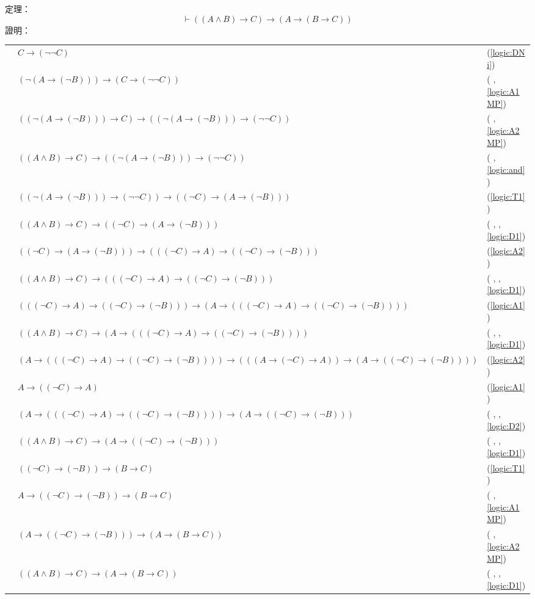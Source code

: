 \documentclass{article}
\newcommand{\sd}[1]{{\left(#1\right)}}
\newcommand{\thm}{定理：}
\newcommand{\pf}{證明：}
\newcommand{\rom}[1]{\romannumeral #1 \relax}
\newcommand{\pftab}[1]{
	\begin{tabular}{ >{\raggedright\arraybackslash}p{0.15\textwidth}<{}  >{\centering\arraybackslash}p{0.7\textwidth} >{\raggedleft\arraybackslash(}p{0.15\textwidth}<{)}}
		#1
	\end{tabular}\\
}
\begin{document}
\thm
\begin{equation}\label{logic:M1_and2}
	\vdash \sd{\sd{A \land B} \to C} \to \sd{A \to \sd{B \to C}}
\end{equation}
\pf\\
\pftab{
	\rom{1}&$C \to \sd{\lnot\lnot C}$&\ref{logic:DNi}\\
	\rom{2}&$\sd{\lnot \sd{A \to \sd{\lnot B}}} \to \sd{C \to \sd{\lnot\lnot C}}$&\rom{1}, \ref{logic:A1MP}\\
	\rom{3}&$\sd{\sd{\lnot \sd{A \to \sd{\lnot B}}} \to C} \to \sd{\sd{\lnot \sd{A \to \sd{\lnot B}}} \to \sd{\lnot\lnot C}}$&\rom{2}, \ref{logic:A2MP}\\
	\rom{4}&$\sd{\sd{A \land B} \to C} \to \sd{\sd{\lnot \sd{A \to \sd{\lnot B}}} \to \sd{\lnot\lnot C}}$&\rom{3}, \ref{logic:and}\\
	\rom{5}&$\sd{\sd{\lnot \sd{A \to \sd{\lnot B}}} \to \sd{\lnot\lnot C}} \to \sd{\sd{\lnot C} \to \sd{A \to \sd{\lnot B}}}$&\ref{logic:T1}\\
	\rom{6}&$\sd{\sd{A \land B} \to C} \to \sd{\sd{\lnot C} \to \sd{A \to \sd{\lnot B}}}$&\rom{4}, \rom{5}, \ref{logic:D1}\\
	\rom{7}&$\sd{\sd{\lnot C} \to \sd{A \to \sd{\lnot B}}} \to \sd{\sd{\sd{\lnot C} \to A} \to \sd{\sd{\lnot C} \to \sd{\lnot B}}}$&\ref{logic:A2}\\
	\rom{8}&$\sd{\sd{A \land B} \to C} \to \sd{\sd{\sd{\lnot C} \to A} \to \sd{\sd{\lnot C} \to \sd{\lnot B}}}$&\rom{6}, \rom{7}, \ref{logic:D1}\\
	\rom{9}&$\sd{\sd{\sd{\lnot C} \to A} \to \sd{\sd{\lnot C} \to \sd{\lnot B}}} \to \sd{ A \to \sd{\sd{\sd{\lnot C} \to A} \to \sd{\sd{\lnot C} \to \sd{\lnot B}}}}$&\ref{logic:A1}\\
	\rom{10}&$\sd{\sd{A \land B} \to C} \to \sd{ A \to \sd{\sd{\sd{\lnot C} \to A} \to \sd{\sd{\lnot C} \to \sd{\lnot B}}}}$&\rom{8}, \rom{9}, \ref{logic:D1}\\
	\rom{11}&$\sd{ A \to \sd{\sd{\sd{\lnot C} \to A} \to \sd{\sd{\lnot C} \to \sd{\lnot B}}}} \to \sd{\sd{\sd{A \to \sd{\lnot C} \to A}} \to \sd{A \to \sd{\sd{\lnot C} \to \sd{\lnot B}}}}$&\ref{logic:A2}\\
	\rom{12}&$A \to \sd{\sd{\lnot C} \to A}$&\ref{logic:A1}\\
	\rom{13}&$\sd{ A \to \sd{\sd{\sd{\lnot C} \to A} \to \sd{\sd{\lnot C} \to \sd{\lnot B}}}} \to \sd{A \to \sd{\sd{\lnot C} \to \sd{\lnot B}}}$&\rom{11}, \rom{12}, \ref{logic:D2}\\
	\rom{14}&$\sd{\sd{A \land B} \to C} \to \sd{A \to \sd{\sd{\lnot C} \to \sd{\lnot B}}}$&\rom{10}, \rom{13}, \ref{logic:D1}\\
	\rom{15}&$\sd{\sd{\lnot C} \to \sd{\lnot B}} \to \sd{B \to C}$&\ref{logic:T1}\\
	\rom{16}&$A \to \sd{\sd{\lnot C} \to \sd{\lnot B}} \to \sd{B \to C}$&\rom{15}, \ref{logic:A1MP}\\
	\rom{17}&$\sd{A \to \sd{\sd{\lnot C} \to \sd{\lnot B}}} \to \sd{A \to \sd{B \to C}}$&\rom{16}, \ref{logic:A2MP}\\
	\rom{18}&$\sd{\sd{A \land B} \to C} \to \sd{A \to \sd{B \to C}}$&\rom{14}, \rom{17}, \ref{logic:D1}\\
}
\end{document}
